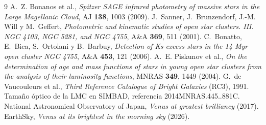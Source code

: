 \documentclass[11pt,a4paper]{article}
\begin{document}
\sloppy
\begin{thebibliography}{9}
 A.~Z. Bonanos et al., \emph{Spitzer SAGE infrared photometry of massive stars in the
Large Magellanic Cloud}, AJ \textbf{138}, 1003 (2009).
 J.~Sanner, J.~Brunzendorf, J.-M. Will y M.~Geffert, \emph{Photometric and kinematic
studies of open star clusters. III. NGC 4103, NGC 5281, and NGC 4755}, A\&A \textbf{369}, 511 (2001).
 C.~Bonatto, E.~Bica, S.~Ortolani y B.~Barbuy, \emph{Detection of Ks-excess stars in
the 14 Myr open cluster NGC 4755}, A\&A \textbf{453}, 121 (2006).
 A.~E. Piskunov et al., \emph{On the determination of age and mass functions of stars
in young open star clusters from the analysis of their luminosity functions}, MNRAS \textbf{349}, 1449
(2004).
 G.~de Vaucouleurs et al., \emph{Third Reference Catalogue of Bright Galaxies} (RC3), 1991.
 Tamaño óptico de la LMC en SIMBAD, referencia 2014MNRAS.445..881C.
 National Astronomical Observatory of Japan, \emph{Venus at greatest brilliancy} (2017).
 EarthSky, \emph{Venus at its brightest in the morning sky} (2026).
\end{thebibliography}
\end{document}
